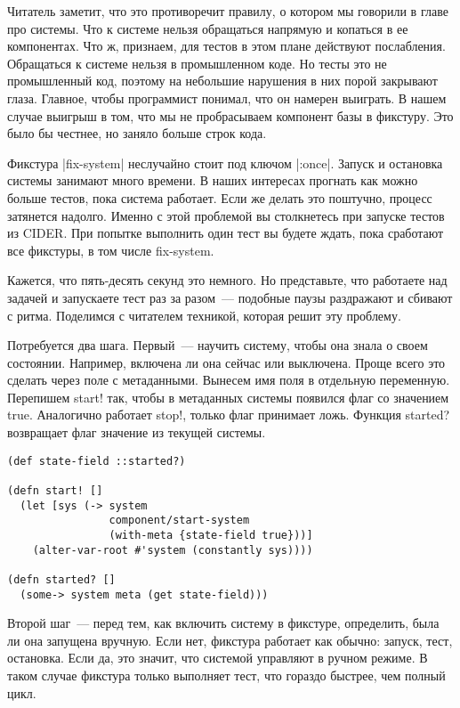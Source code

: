 Читатель заметит, что это противоречит правилу, о котором мы говорили в главе
про системы. Что к системе нельзя обращаться напрямую и копаться в ее
компонентах. Что ж, признаем, для тестов в этом плане действуют
послабления. Обращаться к системе нельзя в промышленном коде. Но тесты это не
промышленный код, поэтому на небольшие нарушения в них порой закрывают
глаза. Главное, чтобы программист понимал, что он намерен выиграть. В нашем
случае выигрыш в том, что мы не пробрасываем компонент базы в фикстуру. Это было
бы честнее, но заняло больше строк кода.

Фикстура \spverb|fix-system| неслучайно стоит под ключом \spverb|:once|. Запуск и остановка
системы занимают много времени. В наших интересах прогнать как можно больше
тестов, пока система работает. Если же делать это поштучно, процесс затянется
надолго. Именно с этой проблемой вы столкнетесь при запуске тестов из CIDER. При
попытке выполнить один тест вы будете ждать, пока сработают все фикстуры, в том
числе fix-system.

Кажется, что пять-десять секунд это немного. Но представьте, что работаете над
задачей и запускаете тест раз за разом~--- подобные паузы раздражают и сбивают с
ритма. Поделимся с читателем техникой, которая решит эту проблему.

Потребуется два шага. Первый~--- научить систему, чтобы она знала о своем
состоянии. Например, включена ли она сейчас или выключена. Проще всего это
сделать через поле с метаданными. Вынесем имя поля в отдельную
переменную. Перепишем start! так, чтобы в метаданных системы появился флаг со
значением true. Аналогично работает stop!, только флаг принимает ложь. Функция
started? возвращает флаг значение из текущей системы.

\begin{verbatim}
(def state-field ::started?)

(defn start! []
  (let [sys (-> system
                component/start-system
                (with-meta {state-field true}))]
    (alter-var-root #'system (constantly sys))))

(defn started? []
  (some-> system meta (get state-field)))
\end{verbatim}

Второй шаг~--- перед тем, как включить систему в фикстуре, определить, была ли она
запущена вручную. Если нет, фикстура работает как обычно: запуск, тест,
остановка. Если да, это значит, что системой управляют в ручном режиме. В таком
случае фикстура только выполняет тест, что гораздо быстрее, чем полный цикл.

